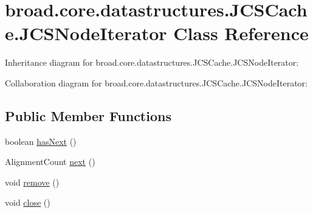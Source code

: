 \hypertarget{classbroad_1_1core_1_1datastructures_1_1_j_c_s_cache_1_1_j_c_s_node_iterator}{\section{broad.\+core.\+datastructures.\+J\+C\+S\+Cache.\+J\+C\+S\+Node\+Iterator Class Reference}
\label{classbroad_1_1core_1_1datastructures_1_1_j_c_s_cache_1_1_j_c_s_node_iterator}
}


Inheritance diagram for broad.\+core.\+datastructures.\+J\+C\+S\+Cache.\+J\+C\+S\+Node\+Iterator\+:


Collaboration diagram for broad.\+core.\+datastructures.\+J\+C\+S\+Cache.\+J\+C\+S\+Node\+Iterator\+:
\subsection*{Public Member Functions}
\begin{DoxyCompactItemize}
\item 
boolean \hyperlink{classbroad_1_1core_1_1datastructures_1_1_j_c_s_cache_1_1_j_c_s_node_iterator_aaa19b276f8f507494017820f3d5fe848}{has\+Next} ()
\item 
Alignment\+Count \hyperlink{classbroad_1_1core_1_1datastructures_1_1_j_c_s_cache_1_1_j_c_s_node_iterator_a29917622c45b4bb6c4e5a6556dbdf7d9}{next} ()
\item 
void \hyperlink{classbroad_1_1core_1_1datastructures_1_1_j_c_s_cache_1_1_j_c_s_node_iterator_a61a88e5ea0e918011f6b1aa94c342ca3}{remove} ()
\item 
void \hyperlink{classbroad_1_1core_1_1datastructures_1_1_j_c_s_cache_1_1_j_c_s_node_iterator_ad84be5a706b26015491a523f6373e73e}{close} ()
\end{DoxyCompactItemize}


